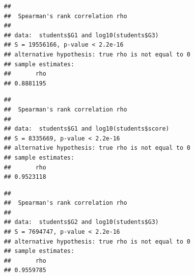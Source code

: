 \documentclass[]{article}
\newenvironment{Shaded}{\begin{snugshade}}{\end{snugshade}}
\newcommand{\DataTypeTok}[1]{\textcolor[rgb]{0.87,0.87,0.75}{#1}}
\newcommand{\FloatTok}[1]{\textcolor[rgb]{0.75,0.75,0.82}{#1}}
\newcommand{\KeywordTok}[1]{\textcolor[rgb]{0.94,0.87,0.69}{#1}}
\newcommand{\NormalTok}[1]{\textcolor[rgb]{0.80,0.80,0.80}{#1}}
\newcommand{\OperatorTok}[1]{\textcolor[rgb]{0.94,0.94,0.82}{#1}}
\newcommand{\StringTok}[1]{\textcolor[rgb]{0.80,0.58,0.58}{#1}}
\begin{document}
\begin{verbatim}
## 
##  Spearman's rank correlation rho
## 
## data:  students$G1 and log10(students$G3)
## S = 19556166, p-value < 2.2e-16
## alternative hypothesis: true rho is not equal to 0
## sample estimates:
##       rho 
## 0.8881195
\end{verbatim}

\begin{Shaded}
\end{Shaded}

\begin{verbatim}
## 
##  Spearman's rank correlation rho
## 
## data:  students$G1 and log10(students$score)
## S = 8335669, p-value < 2.2e-16
## alternative hypothesis: true rho is not equal to 0
## sample estimates:
##       rho 
## 0.9523118
\end{verbatim}

\begin{Shaded}
\end{Shaded}

\begin{verbatim}
## 
##  Spearman's rank correlation rho
## 
## data:  students$G2 and log10(students$G3)
## S = 7694747, p-value < 2.2e-16
## alternative hypothesis: true rho is not equal to 0
## sample estimates:
##       rho 
## 0.9559785
\end{verbatim}

\begin{Shaded}
\end{Shaded}
\end{document}
